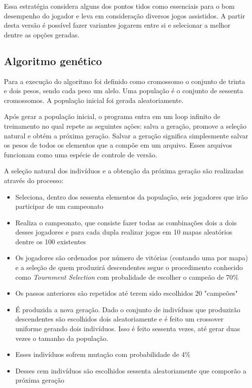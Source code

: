 \documentclass[a4paper,titlepage,11pt]{article}
\begin{document}
Essa estratégia considera alguns dos pontos tidos como essenciais para o bom desempenho do jogador e leva em consideração diversos jogos assistidos. A partir desta versão é possível fazer variantes jogarem entre si e selecionar a melhor dentre as opções geradas.


\subsection{Algoritmo genético}
Para a execução do algoritmo foi definido como cromossomo o conjunto de trinta e dois pesos, sendo cada peso um alelo. Uma população é o conjunto de sessenta cromossomos. A população inicial foi gerada aleatoriamente.

Após gerar a população inicial, o programa entra em um loop infinito de treinamento no qual repete as seguintes ações: salva a geração, promove a seleção natural e obtém a próxima geração. Salvar a geração significa simplesmente salvar os pesos de todos os elementos que a compõe em um arquivo. Esses arquivos funcionam como uma espécie de controle de versão.

A seleção natural dos indivíduos e a obtenção da próxima geração são realizadas através do processo:
\begin{itemize}
	\item Seleciona, dentro dos sessenta elementos da população, seis jogadores que irão participar de um campeonato
	\item Realiza o campeonato, que consiste fazer todas as combinações dois a dois desses jogadores e para cada dupla realizar jogos em 10 mapas aleatórios dentre os 100 existentes 
	\item Os jogadores são ordenados por número de vitórias (contando uma por mapa) e a seleção de quem produzirá descendentes segue o procedimento conhecido como {\em Tournment Selection} com probalidade de escolher o campeão de 70\%
	\item Os passos anteriores são repetidos até terem sido escolhidos 20 "campeões"
	\item É produzida a nova geração. Dado o conjunto de indivíduos que produzirão descendentes são escolhidos dois aleatoriamente e é feito um crossover uniforme gerando dois indivíduos. Isso é feito sessenta vezes, até gerar duas vezes o tamanho da população. 
	\item Esses indivíduos sofrem mutação com probabilidade de 4\%
	\item Desses cem indivíduos são escolhidos sessenta aleatoriamente que comporão a próxima geração
\end{itemize}
\end{document}
